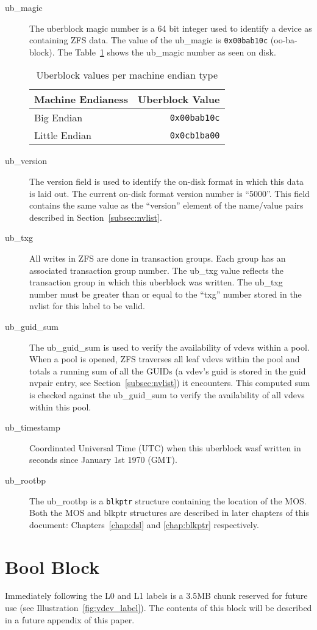 \begin{description}
\item[ub\_magic]
  The uberblock magic number is a 64 bit integer
  used to identify a device as containing ZFS data.
  The value of the ub\_magic is \verb|0x00bab10c| (oo-ba-block).
  The Table~\ref{tbl:endianess_ub} shows the ub\_magic number as seen on disk.
  \begin{table}[hb]
    \caption{Uberblock values per machine endian type}
    \label{tbl:endianess_ub}
    \centering
    \begin{tabular}{lr}
      \toprule
      \textbf{Machine Endianess} &     \textbf{Uberblock Value}\\
      \midrule
      Big Endian &                     \verb|0x00bab10c|\\
      Little Endian &                  \verb|0x0cb1ba00|\\
      \bottomrule
    \end{tabular}
  \end{table}
  
\item[ub\_version]
  The version field is used to identify the on-disk format in which this data is laid out.
  The current on-disk format version number is ``5000''.
  This field contains the same value
  as the “version” element of the name/value pairs described in Section~\ref{subsec:nvlist}. 

\item[ub\_txg]
  All writes in ZFS are done in transaction groups.
  Each group has an associated transaction group number.
  The ub\_txg value reflects the transaction group in which
  this uberblock was written.
  The ub\_txg number must be greater than or equal to the ``txg'' number
  stored in the nvlist for this label to be valid.

\item[ub\_guid\_sum]
  The ub\_guid\_sum is used to verify the availability of vdevs within a pool.
  When a pool is opened,
  ZFS traverses all leaf vdevs within the pool
  and totals a running sum of all the GUIDs
  (a vdev's guid is stored in the guid nvpair entry, see Section~\ref{subsec:nvlist}) it encounters.
  This computed sum is checked against the ub\_guid\_sum
  to verify the availability of all vdevs within this pool.

\item[ub\_timestamp]
  Coordinated Universal Time (UTC) when
  this uberblock wasf written in seconds since January 1st 1970 (GMT).

\item[ub\_rootbp]
  The ub\_rootbp is a \verb|blkptr| structure containing the location of the MOS.
  Both the MOS and blkptr structures are described in later chapters of this document:
  Chapters~\ref{chap:dsl} and \ref{chap:blkptr} respectively.
\end{description}

\section{Bool Block}

Immediately following the L0 and L1 labels is a 3.5MB chunk reserved for future use
(see Illustration~\ref{fig:vdev_label}).
The contents of this block will be described in a future appendix of this paper.
